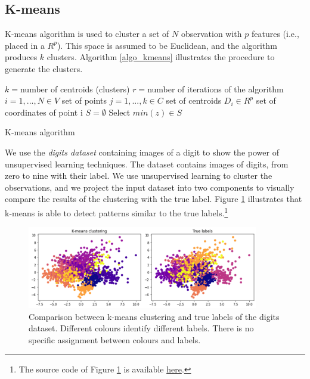 \subsection{K-means} \label{secKmeans}
K-means algorithm is used to cluster a set of $N$ observation with $p$ features (i.e., placed in a $R^p$). This space is assumed to be Euclidean, and the algorithm produces $k$ clusters. Algorithm \ref {algo_kmeans} illustrates the procedure to generate the clusters.

\begin{algorithm}[H]
    \DontPrintSemicolon
    \SetAlgoLined
    $k=$number of centroids (clusters)\;
    $r=$number of iterations of the algorithm\;
    $i=1,...,N \in V$ set of points \;
    $j=1,...,k \in C$ set of centroids \;
    $D_i \in R^p $ set of coordinates of point i \;
    $S= \emptyset $ \;
    Select $min(z) \in S$ \;

\caption{K-means algorithm}
\label{algo_kmeans}    
\end{algorithm}

We use the \textit{digits dataset} containing images of a digit to show the power of unsupervised learning techniques. The dataset contains images of digits, from zero to nine with their label. We use unsupervised learning to cluster the observations, and we project the input dataset into two components to visually compare the results of the clustering with the true label. Figure \ref{fig_kmeans} illustrates that k-means is able to detect patterns similar to the true labels.\footnote{The source code of Figure \ref{fig_kmeans} is available \href{https://github.com/aletuf93/logproj/blob/master/examples/06.\%20Unsupervised\%20learning.ipynb}{here}.
}

\begin{figure}[hbt!]
\centering
\includegraphics[width=0.9\textwidth]{SectionLetsMath/unsupervisedLearning_figures/fig_kmeans.png}
\captionsetup{type=figure}
\caption{Comparison between k-means clustering and true labels of the digits dataset. Different colours identify different labels. There is no specific assignment between colours and labels.}
\label{fig_kmeans}
\end{figure}

